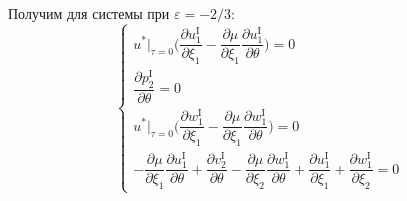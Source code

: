 \documentclass[../master.tex]{subfiles}
\begin{document}
Получим для системы при $\varepsilon=-2/3$:
\begin{equation}
	\begin{cases}
		u^*\big|_{\tau=0}\bigg( \dfrac{\partial u_1^{\text{I}}}{\partial \xi_1} - \dfrac{\partial \mu}{\partial \xi_1} \dfrac{\partial u_1^{\text{I}}}{\partial \theta} \bigg) = 0 \\[2ex]
		\dfrac{\partial p_2^{\text{I}}}{\partial \theta} = 0 \\[2ex]
		u^*\big|_{\tau=0}\bigg( \dfrac{\partial w_1^{\text{I}}}{\partial \xi_1} -  \dfrac{\partial \mu}{\partial \xi_1} \dfrac{\partial w_1^{\text{I}}}{\partial \theta} \bigg) = 0 \\[2ex]
		-\dfrac{\partial \mu}{\partial \xi_1} \dfrac{\partial u_1^{\text{I}}}{\partial \theta} + 
			 \dfrac{\partial v_2^{\text{I}}}{\partial \theta} - 
			 \dfrac{\partial \mu}{\partial \xi_2} \dfrac{\partial w_1^{\text{I}}}{\partial \theta} + 
			 \dfrac{\partial u_1^{\text{I}}}{\partial \xi_1} + 
			 \dfrac{\partial w_1^{\text{I}}}{\partial \xi_2} = 0
	\end{cases}
\end{equation}
\end{document}
